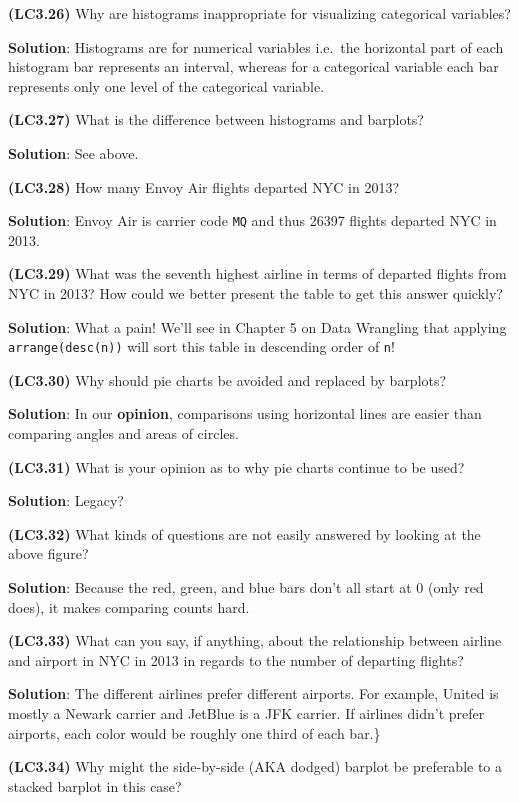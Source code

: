\documentclass[12pt, krantz2,]{krantz}
\begin{document}
\textbf{(LC3.26)} Why are histograms inappropriate for visualizing categorical variables?

\textbf{Solution}: Histograms are for numerical variables i.e.~the horizontal part of each histogram bar represents an interval, whereas for a categorical variable each bar represents only one level of the categorical variable.

\textbf{(LC3.27)} What is the difference between histograms and barplots?

\textbf{Solution}: See above.

\textbf{(LC3.28)} How many Envoy Air flights departed NYC in 2013?

\textbf{Solution}: Envoy Air is carrier code \texttt{MQ} and thus 26397 flights departed NYC in 2013.

\textbf{(LC3.29)} What was the seventh highest airline in terms of departed flights from NYC in 2013? How could we better present the table to get this answer quickly?

\textbf{Solution}: What a pain! We'll see in Chapter 5 on Data Wrangling that applying \texttt{arrange(desc(n))} will sort this table in descending order of \texttt{n}!

\textbf{(LC3.30)} Why should pie charts be avoided and replaced by barplots?

\textbf{Solution}: In our \textbf{opinion}, comparisons using horizontal lines are easier than comparing angles and areas of circles.

\textbf{(LC3.31)} What is your opinion as to why pie charts continue to be used?

\textbf{Solution}: Legacy?

\textbf{(LC3.32)} What kinds of questions are not easily answered by looking at the above figure?

\textbf{Solution}: Because the red, green, and blue bars don't all start at 0 (only red does), it makes comparing counts hard.

\textbf{(LC3.33)} What can you say, if anything, about the relationship between airline and airport in NYC in 2013 in regards to the number of departing flights?

\textbf{Solution}: The different airlines prefer different airports. For example, United is mostly a Newark carrier and JetBlue is a JFK carrier. If airlines didn't prefer airports, each color would be roughly one third of each bar.\}

\textbf{(LC3.34)} Why might the side-by-side (AKA dodged) barplot be preferable to a stacked barplot in this case?
\end{document}
